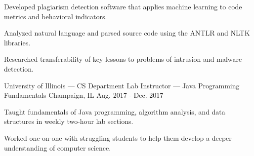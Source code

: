 \begin{cventries}
{\begin{cvitems}
		\item {Developed plagiarism detection software that applies machine learning to code metrics and behavioral indicators.}
		\item {Analyzed natural language and parsed source code using the ANTLR and NLTK libraries.}
		\item {Researched transferability of key lessons to problems of intrusion and malware detection.}
	\end{cvitems}
}
\cventry
{University of Illinois — CS Department} %
{Lab Instructor — Java Programming Fundamentals} %
{Champaign, IL} %
{Aug. 2017 - Dec. 2017} %
{
	\begin{cvitems} %
		\item {Taught fundamentals of Java programming, algorithm analysis, and data structures in weekly two-hour lab sections.}
		\item {Worked one-on-one with struggling students to help them develop a deeper understanding of computer science.}
	\end{cvitems}
}
\end{cventries}
